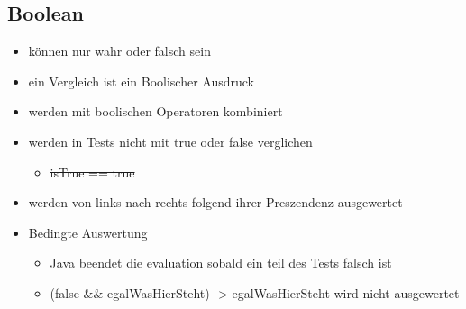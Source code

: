 \documentclass[11pt]{article}
\begin{document}
\subsection{Boolean}
\label{sec:org36b6a60}
\begin{itemize}
\item können nur wahr oder falsch sein\\
\item ein Vergleich ist ein Boolischer Ausdruck\\
\item werden mit boolischen Operatoren kombiniert\\
\item werden in Tests nicht mit true oder false verglichen\\
\begin{itemize}
\item \sout{isTrue == true}\\
\end{itemize}
\item werden von links nach rechts folgend ihrer Preszendenz ausgewertet\\
\item Bedingte Auswertung\\
\begin{itemize}
\item Java beendet die evaluation sobald ein teil des Tests falsch ist\\
\item (false \&\& egalWasHierSteht) -> egalWasHierSteht wird nicht ausgewertet\\
\end{itemize}
\end{itemize}
\end{document}
